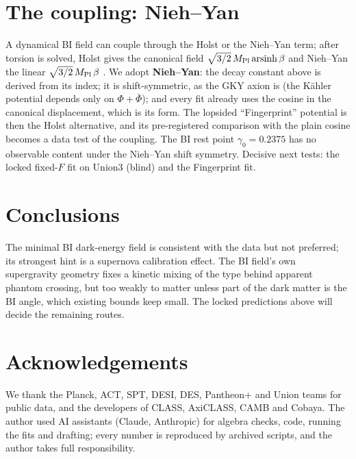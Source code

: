 \documentclass[11pt]{article}
\newcommand{\Mp}{M_{\rm Pl}}
\begin{document}
\section{The coupling: Nieh--Yan}
A dynamical BI field can couple through the Holst or the Nieh--Yan term; after torsion is solved, Holst gives the
canonical field $\sqrt{3/2}\,\Mp\,{\rm arsinh}\,\beta$ and Nieh--Yan the linear $\sqrt{3/2}\,\Mp\,\beta$ \cite{calcagni2009}.
We adopt \textbf{Nieh--Yan}: the decay constant above is derived from its index; it is shift-symmetric, as the GKY
axion is (the K\"ahler potential depends only on $\Phi+\bar\Phi$); and every fit already uses the cosine in the
canonical displacement, which is its form. The lopsided ``Fingerprint'' potential is then the Holst alternative, and
its pre-registered comparison with the plain cosine becomes a data test of the coupling. The BI rest point
$\gamma_0=0.2375$ has no observable content under the Nieh--Yan shift symmetry. Decisive next tests: the locked fixed-$F$
fit on Union3 (blind) and the Fingerprint fit.

\section{Conclusions}
The minimal BI dark-energy field is consistent with the data but not preferred; its strongest hint is a supernova
calibration effect. The BI field's own supergravity geometry fixes a kinetic mixing of the type behind apparent phantom
crossing, but too weakly to matter unless part of the dark matter is the BI angle, which existing bounds keep small.
The locked predictions above will decide the remaining routes.

\section*{Acknowledgements}
We thank the Planck, ACT, SPT, DESI, DES, Pantheon+ and Union teams for public data, and the developers of CLASS,
AxiCLASS, CAMB and Cobaya. The author used AI assistants (Claude, Anthropic) for algebra checks, code, running the fits
and drafting; every number is reproduced by archived scripts, and the author takes full responsibility.
\end{document}
